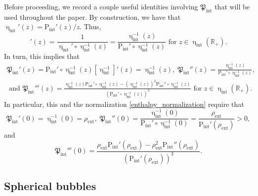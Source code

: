 \documentclass[11pt,reqno]{amsart}
\numberwithin{equation}{section}
\newcommand{\m}{\mathrm}
\def\pint{\m{P}_{\m{int}}}
\def\pfint{\mathfrak{P}_{\m{int}}}
\def\hint{\upeta_{\m{int}}}
\def\R{\mathbb{R}}
\begin{document}
Before proceeding, we record a couple useful identities involving $\pfint$ that will be used throughout the paper.  By construction, we have that $\hint'(z) = \pint'(z)/z$.  Thus, 
\begin{equation}
 [\hint^{-1}]'(z) = \frac{1}{\hint'\circ \hint^{-1}(z) } = \frac{\hint^{-1}(z)}{\pint'\circ \hint^{-1}(z)}   \text{ for } z \in \hint(\R_+). 
\end{equation}
In turn, this implies that 
\begin{multline}
 \pfint'(z) = \pint' \circ \hint^{-1}(z)  [\hint^{-1}]'(z) =  \hint^{-1}(z), \; 
\pfint''(z) = \frac{\hint^{-1}(z)}{\pint'\circ \hint^{-1}(z)},  \\
\text{ and } \pfint'''(z) = \frac{\hint^{-1}(z) \pint'\circ \hint^{-1}(z) - (\hint^{-1}(z))^2 \pint''\circ \hint^{-1}(z)}{(\pint'\circ \hint^{-1}(z))^3}
 \text{ for } z \in \hint(\R_+). 
\end{multline}
In particular, this and the normalization \eqref{enthalpy_normalization} require that
\begin{equation}\label{bifurcation_thm_6}
\pfint'(0) = \hint^{-1}(0) = \rho_{\m{ext}}, \;
\pfint''(0) = \frac{\hint^{-1}(0)}{\pint' \circ \hint^{-1}(0)} =  \frac{\rho_{\m{ext}}}{\pint'(\rho_{\m{ext}})} >0,
\end{equation}
and 
\begin{equation}\label{bifurcation_thm_6_5}
 \pfint'''(0) = \frac{\rho_{\m{ext}} \pint'(\rho_{\m{ext}}) - \rho_{\m{ext}}^2 \pint''(\rho_{\m{ext}})}{(\pint'(\rho_{\m{ext}}))^3}. 
\end{equation}

\subsection{Spherical bubbles}\label{subsec:1.2}
\end{document}
